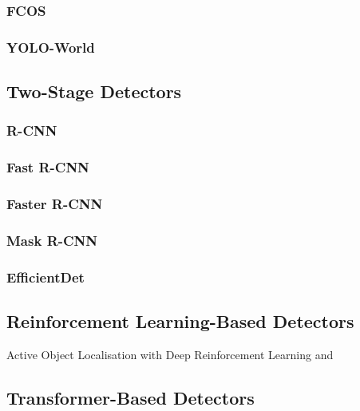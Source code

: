 \subsubsection{FCOS}
\label{subsubsec:3_fcos}

\subsubsection{YOLO-World}
\label{subsubsec:3_yolo-world}

\subsection{Two-Stage Detectors}
\label{subsec:3_two-stage}

\subsubsection{R-CNN}
\label{subsubsec:3_rcnn}

\subsubsection{Fast R-CNN}
\label{subsubsec:3_fastrcnn}

\subsubsection{Faster R-CNN}
\label{subsubsec:3_fasterrcnn}

\subsubsection{Mask R-CNN}
\label{subsubsec:3_maskrcnn}

\subsubsection{EfficientDet}
\label{subsubsec:3_efficientdet}

\subsection{Reinforcement Learning-Based Detectors}
\label{subsec:3_rl-stage}
Active Object Localisation with Deep Reinforcement Learning and \cite{bartolo2024integrating}

\subsection{Transformer-Based Detectors}
\label{subsec:3_transformer-stage}

